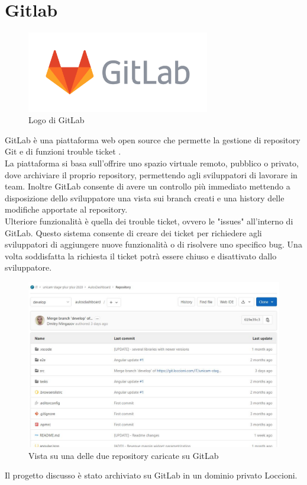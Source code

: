 \section{Gitlab}
\begin{figure}[h]
\begin{center}
  \includegraphics[width=8cm]{images/gitlab_logo.png}
  \caption{Logo di GitLab}\label{fig:git}
\end{center}
\end{figure}
\FloatBarrier
GitLab è una piattaforma web open source che permette la gestione di repository Git e di funzioni trouble ticket \cite{GITLAB}.\\
La piattaforma si basa sull'offrire uno spazio virtuale remoto, pubblico o privato, dove archiviare il proprio repository, permettendo agli sviluppatori di lavorare in team.
Inoltre GitLab consente di avere un controllo più immediato mettendo a disposizione dello sviluppatore una vista sui branch creati e una history delle modifiche apportate al repository. \\
Ulteriore funzionalità è quella dei trouble ticket, ovvero le "issues" all'interno di GitLab. Questo sistema consente di creare dei ticket per richiedere agli sviluppatori di aggiungere nuove funzionalità o di risolvere uno specifico bug. Una volta soddisfatta la richiesta il ticket potrà essere chiuso e disattivato dallo sviluppatore.
\begin{figure}[h]
\begin{center}
  \includegraphics[width=13cm]{images/Repository_GitLab.JPG}
  \caption{Vista su una delle due repository caricate su GitLab}\label{fig:git}
\end{center}
\end{figure}
\FloatBarrier
Il progetto discusso è stato archiviato su GitLab in un dominio privato Loccioni. 

